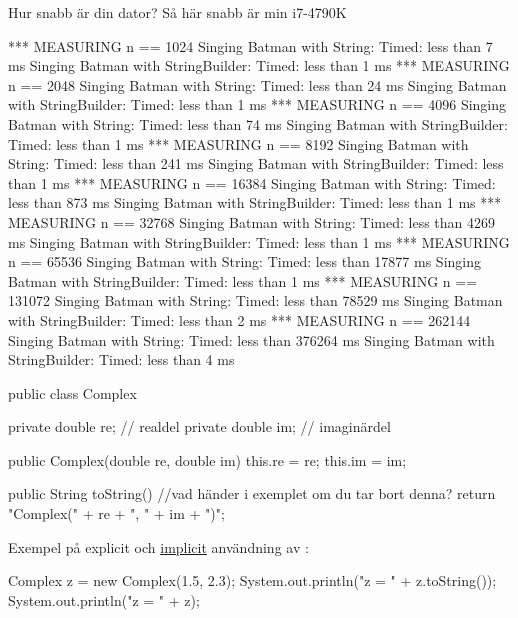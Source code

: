 \documentclass{lecturenotes}
\begin{document}
\begin{Slide}{Hur snabb är din dator? Så här snabb är min i7-4790K}
\begin{Code}[basicstyle=\ttfamily\fontsize{6}{7}\selectfont]
*** MEASURING n == 1024
  Singing Batman with String:        Timed: less than 7 ms
  Singing Batman with StringBuilder: Timed: less than 1 ms
*** MEASURING n == 2048
  Singing Batman with String:        Timed: less than 24 ms
  Singing Batman with StringBuilder: Timed: less than 1 ms
*** MEASURING n == 4096
  Singing Batman with String:        Timed: less than 74 ms
  Singing Batman with StringBuilder: Timed: less than 1 ms
*** MEASURING n == 8192
  Singing Batman with String:        Timed: less than 241 ms
  Singing Batman with StringBuilder: Timed: less than 1 ms
*** MEASURING n == 16384
  Singing Batman with String:        Timed: less than 873 ms
  Singing Batman with StringBuilder: Timed: less than 1 ms
*** MEASURING n == 32768
  Singing Batman with String:        Timed: less than 4269 ms
  Singing Batman with StringBuilder: Timed: less than 1 ms
*** MEASURING n == 65536
  Singing Batman with String:        Timed: less than 17877 ms
  Singing Batman with StringBuilder: Timed: less than 1 ms
*** MEASURING n == 131072
  Singing Batman with String:        Timed: less than 78529 ms
  Singing Batman with StringBuilder: Timed: less than 2 ms
*** MEASURING n == 262144
  Singing Batman with String:        Timed: less than 376264 ms
  Singing Batman with StringBuilder: Timed: less than 4 ms  
\end{Code}
\end{Slide}

\begin{Slide}{}

\begin{Code}
public class Complex {
    private double re; // realdel
    private double im; // imaginärdel
    
    public Complex(double re, double im) {
        this.re = re;
        this.im = im;
    }
    
    public String toString() { //vad händer i exemplet om du tar bort denna?
        return "Complex(" + re + ", " + im + ")";
    }
}
\end{Code}


Exempel på explicit och \href{https://docs.oracle.com/javase/specs/jls/se8/html/jls-4.html#jls-4.3.2}{implicit} användning av :

\begin{Code}
Complex z = new Complex(1.5, 2.3);
System.out.println("z = " + z.toString());
System.out.println("z = " + z);
\end{Code}
\end{Slide} 
\end{document}
